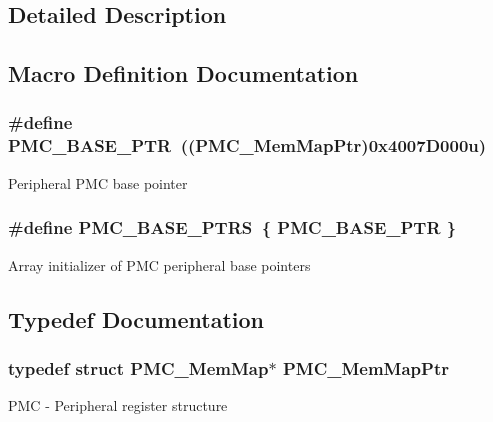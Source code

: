 \subsection{Detailed Description}


\subsection{Macro Definition Documentation}
\hypertarget{group___p_m_c___peripheral_gaf32df9f1096263f10a5e8978a338b2ac}{}
\subsubsection[{P\+M\+C\+\_\+\+B\+A\+S\+E\+\_\+\+P\+T\+R}]{\setlength{\rightskip}{0pt plus 5cm}\#define P\+M\+C\+\_\+\+B\+A\+S\+E\+\_\+\+P\+T\+R~(({\bf P\+M\+C\+\_\+\+Mem\+Map\+Ptr})0x4007\+D000u)}\label{group___p_m_c___peripheral_gaf32df9f1096263f10a5e8978a338b2ac}
Peripheral P\+M\+C base pointer \hypertarget{group___p_m_c___peripheral_ga4bcd62643d597f7230f9c1e3d03caaa7}{}
\subsubsection[{P\+M\+C\+\_\+\+B\+A\+S\+E\+\_\+\+P\+T\+R\+S}]{\setlength{\rightskip}{0pt plus 5cm}\#define P\+M\+C\+\_\+\+B\+A\+S\+E\+\_\+\+P\+T\+R\+S~\{ {\bf P\+M\+C\+\_\+\+B\+A\+S\+E\+\_\+\+P\+T\+R} \}}\label{group___p_m_c___peripheral_ga4bcd62643d597f7230f9c1e3d03caaa7}
Array initializer of P\+M\+C peripheral base pointers 

\subsection{Typedef Documentation}
\hypertarget{group___p_m_c___peripheral_ga0e73f22a2fa26cbb012851719e34812e}{}
\subsubsection[{P\+M\+C\+\_\+\+Mem\+Map\+Ptr}]{\setlength{\rightskip}{0pt plus 5cm}typedef struct {\bf P\+M\+C\+\_\+\+Mem\+Map}$\ast$ {\bf P\+M\+C\+\_\+\+Mem\+Map\+Ptr}}\label{group___p_m_c___peripheral_ga0e73f22a2fa26cbb012851719e34812e}
P\+M\+C -\/ Peripheral register structure 